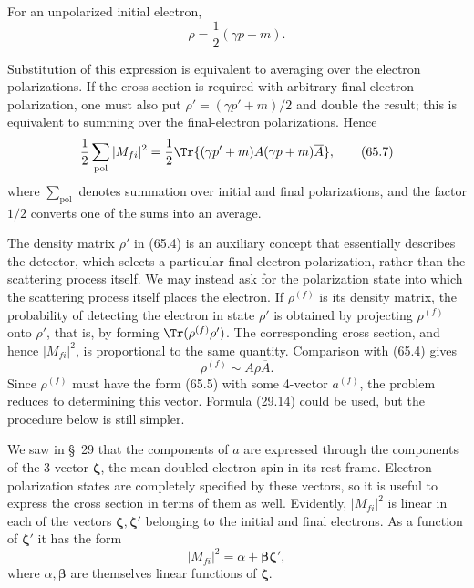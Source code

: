 For an unpolarized initial electron,
\begin{equation}
\rho=\frac12(\gamma p+m).
\tag{65.6}
\end{equation}

Substitution of this expression is equivalent to averaging over the electron polarizations. If the cross section is required with arbitrary final-electron polarization, one must also put $\rho'=(\gamma p'+m)/2$ and double the result; this is equivalent to summing over the final-electron polarizations. Hence
\begin{equation}
\frac12\sum_{\text{pol}}|M_{fi}|^2
=\frac12\Tr\{(\gamma p'+m)A(\gamma p+m)\overline A\},
\tag{65.7}
\end{equation}
where $\sum_{\text{pol}}$ denotes summation over initial and final polarizations, and the factor $1/2$ converts one of the sums into an average.

The density matrix $\rho'$ in (65.4) is an auxiliary concept that essentially describes the detector, which selects a particular final-electron polarization, rather than the scattering process itself. We may instead ask for the polarization state into which the scattering process itself places the electron. If $\rho^{(f)}$ is its density matrix, the probability of detecting the electron in state $\rho'$ is obtained by projecting $\rho^{(f)}$ onto $\rho'$, that is, by forming $\Tr(\rho^{(f)}\rho')$. The corresponding cross section, and hence $|M_{fi}|^2$, is proportional to the same quantity. Comparison with (65.4) gives
\begin{equation}
\rho^{(f)}\sim A\rho\overline A.
\tag{65.8}
\end{equation}
Since $\rho^{(f)}$ must have the form (65.5) with some 4-vector $a^{(f)}$, the problem reduces to determining this vector. Formula (29.14) could be used, but the procedure below is still simpler.

We saw in \S~29 that the components of $a$ are expressed through the components of the 3-vector $\boldsymbol\zeta$, the mean doubled electron spin in its rest frame. Electron polarization states are completely specified by these vectors, so it is useful to express the cross section in terms of them as well. Evidently, $|M_{fi}|^2$ is linear in each of the vectors $\boldsymbol\zeta,\boldsymbol\zeta'$ belonging to the initial and final electrons. As a function of $\boldsymbol\zeta'$ it has the form
\begin{equation}
|M_{fi}|^2=\alpha+\boldsymbol\beta\boldsymbol\zeta',
\tag{65.9}
\end{equation}
where $\alpha,\boldsymbol\beta$ are themselves linear functions of $\boldsymbol\zeta$.

